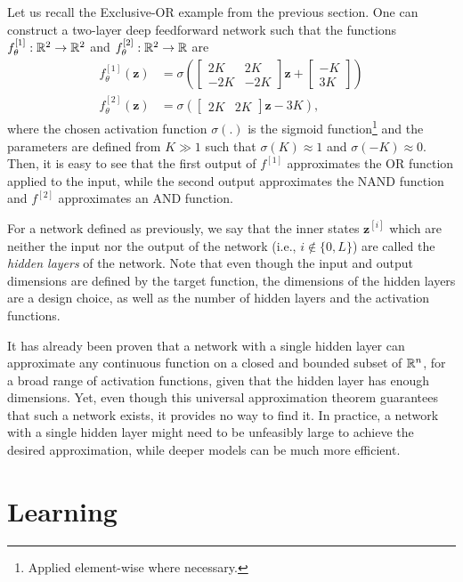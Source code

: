 Let us recall the Exclusive-OR example from the previous section. One can construct a two-layer deep feedforward network such that the functions $f_\theta^{[1]}:\mathbb{R}^2\to\mathbb{R}^2$ and $f_\theta^{[2]}:\mathbb{R}^2\to\mathbb{R}$ are
\begin{align*}
    f_\theta^{[1]}(\bm{z}) &= \sigma\left(
    \begin{bmatrix}
    2K & 2K \\
    -2K & -2K
    \end{bmatrix}\bm{z} + \begin{bmatrix}
    -K \\
    3K
    \end{bmatrix}\right) \\
    f_\theta^{[2]}(\bm{z}) &= \sigma\left(
    \begin{bmatrix}
    2K & 2K
    \end{bmatrix}\bm{z} - 3K\right)
,\end{align*}
where the chosen activation function $\sigma(.)$ is the sigmoid function\footnote{Applied element-wise where necessary.} and the parameters are defined from $K \gg 1$ such that $\sigma(K) \approx 1$ and $\sigma(-K) \approx 0$.
Then, it is easy to see that the first output of $f^{[1]}$ approximates the OR function applied to the input, while the second output approximates the NAND function and $f^{[2]}$ approximates an AND function.

For a network defined as previously, we say that the inner states $\bm{z}^{[i]}$ which are neither the input nor the output of the network (i.e., $i\not\in \{0,L\}$) are called the \textit{hidden layers} of the network.
Note that even though the input and output dimensions are defined by the target function, the dimensions of the hidden layers are a design choice, as well as the number of hidden layers and the activation functions.

It has already been proven that a network with a single hidden layer can approximate any continuous function on a closed and bounded subset of $\mathbb{R}^n$, for a broad range of activation functions, given that the hidden layer has enough dimensions\cite{hornik_multilayer_1989,leshno_multilayer_1993}.
Yet, even though this universal approximation theorem guarantees that such a network exists, it provides no way to find it.
In practice, a network with a single hidden layer might need to be unfeasibly large to achieve the desired approximation, while deeper models can be much more efficient\cite{goodfellow_deep_2016}.

\section{Learning}

